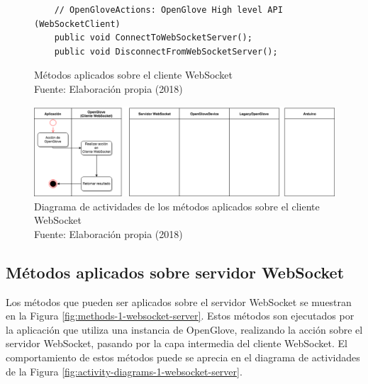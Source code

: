 \begin{figure}[H]
  \begin{center} 
      \begin{lstlisting}
	// OpenGloveActions: OpenGlove High level API (WebSocketClient)
	public void ConnectToWebSocketServer();
	public void DisconnectFromWebSocketServer();
	\end{lstlisting}
   \captionsetup{justification=centering}
    \caption[Métodos aplicados sobre el cliente WebSocket]{Métodos aplicados sobre el cliente WebSocket \\Fuente: Elaboración propia (2018)}
    \label{fig:methods-0-api-hl}
  \end{center}
\end{figure}



\begin{figure}[H]
  \begin{center} 
   	\includegraphics[width=1.0\textwidth]{images/chapter04/ActivityDiagrams-OpenGloveActions-0.png} 
   	\captionsetup{justification=centering}
    \caption[Diagrama de actividades de los métodos aplicados sobre el cliente WebSocket]{Diagrama de actividades de los métodos aplicados sobre el cliente WebSocket\\Fuente: Elaboración propia (2018)}
    \label{fig:activity-diagrams-0-api-hl}
  \end{center}
\end{figure}




\subsection{Métodos aplicados sobre servidor WebSocket}
\label{subsection:method-websocket-server}
Los métodos que pueden ser aplicados sobre el servidor WebSocket se muestran en la Figura \ref{fig:methods-1-websocket-server}. Estos métodos son ejecutados por la aplicación que utiliza una instancia de OpenGlove, realizando la acción sobre el servidor WebSocket, pasando por la capa intermedia del cliente WebSocket. El comportamiento de estos métodos puede se aprecia en el diagrama de actividades de la Figura \ref{fig:activity-diagrams-1-websocket-server}.




